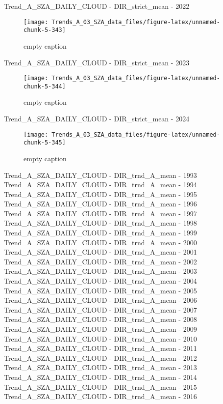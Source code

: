 \documentclass[
  10pt,
  a4paper,oneside]{article}
\begin{document}
Trend\_A\_SZA\_DAILY\_CLOUD - DIR\_strict\_mean - 2022

\begin{figure}[!ht]

{\centering \texttt{[image: Trends\_A\_03\_SZA\_data\_files/figure-latex/unnamed-chunk-5-343]} 

}

\caption{ empty caption }\label{fig:unnamed-chunk-5-343}
\end{figure}

Trend\_A\_SZA\_DAILY\_CLOUD - DIR\_strict\_mean - 2023

\begin{figure}[!ht]

{\centering \texttt{[image: Trends\_A\_03\_SZA\_data\_files/figure-latex/unnamed-chunk-5-344]} 

}

\caption{ empty caption }\label{fig:unnamed-chunk-5-344}
\end{figure}

Trend\_A\_SZA\_DAILY\_CLOUD - DIR\_strict\_mean - 2024

\begin{figure}[!ht]

{\centering \texttt{[image: Trends\_A\_03\_SZA\_data\_files/figure-latex/unnamed-chunk-5-345]} 

}

\caption{ empty caption }\label{fig:unnamed-chunk-5-345}
\end{figure}

Trend\_A\_SZA\_DAILY\_CLOUD - DIR\_trnd\_A\_mean - 1993
Trend\_A\_SZA\_DAILY\_CLOUD - DIR\_trnd\_A\_mean - 1994
Trend\_A\_SZA\_DAILY\_CLOUD - DIR\_trnd\_A\_mean - 1995
Trend\_A\_SZA\_DAILY\_CLOUD - DIR\_trnd\_A\_mean - 1996
Trend\_A\_SZA\_DAILY\_CLOUD - DIR\_trnd\_A\_mean - 1997
Trend\_A\_SZA\_DAILY\_CLOUD - DIR\_trnd\_A\_mean - 1998
Trend\_A\_SZA\_DAILY\_CLOUD - DIR\_trnd\_A\_mean - 1999
Trend\_A\_SZA\_DAILY\_CLOUD - DIR\_trnd\_A\_mean - 2000
Trend\_A\_SZA\_DAILY\_CLOUD - DIR\_trnd\_A\_mean - 2001
Trend\_A\_SZA\_DAILY\_CLOUD - DIR\_trnd\_A\_mean - 2002
Trend\_A\_SZA\_DAILY\_CLOUD - DIR\_trnd\_A\_mean - 2003
Trend\_A\_SZA\_DAILY\_CLOUD - DIR\_trnd\_A\_mean - 2004
Trend\_A\_SZA\_DAILY\_CLOUD - DIR\_trnd\_A\_mean - 2005
Trend\_A\_SZA\_DAILY\_CLOUD - DIR\_trnd\_A\_mean - 2006
Trend\_A\_SZA\_DAILY\_CLOUD - DIR\_trnd\_A\_mean - 2007
Trend\_A\_SZA\_DAILY\_CLOUD - DIR\_trnd\_A\_mean - 2008
Trend\_A\_SZA\_DAILY\_CLOUD - DIR\_trnd\_A\_mean - 2009
Trend\_A\_SZA\_DAILY\_CLOUD - DIR\_trnd\_A\_mean - 2010
Trend\_A\_SZA\_DAILY\_CLOUD - DIR\_trnd\_A\_mean - 2011
Trend\_A\_SZA\_DAILY\_CLOUD - DIR\_trnd\_A\_mean - 2012
Trend\_A\_SZA\_DAILY\_CLOUD - DIR\_trnd\_A\_mean - 2013
Trend\_A\_SZA\_DAILY\_CLOUD - DIR\_trnd\_A\_mean - 2014
Trend\_A\_SZA\_DAILY\_CLOUD - DIR\_trnd\_A\_mean - 2015
Trend\_A\_SZA\_DAILY\_CLOUD - DIR\_trnd\_A\_mean - 2016
\end{document}
